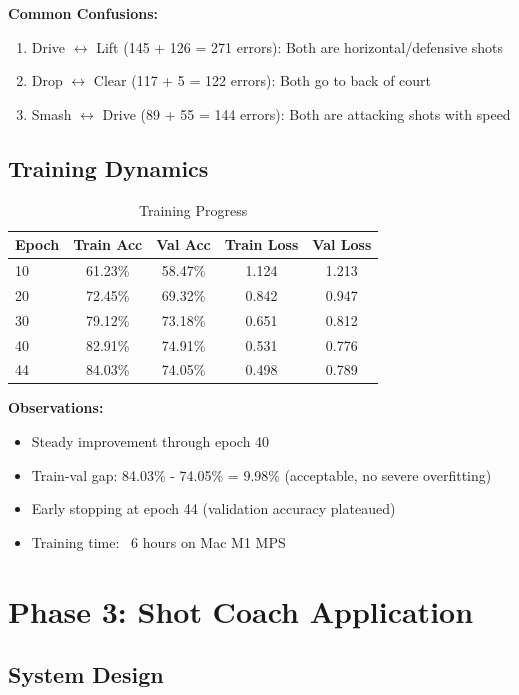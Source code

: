 \documentclass[12pt,a4paper]{article}
\begin{document}
\textbf{Common Confusions:}
\begin{enumerate}
\item Drive $\leftrightarrow$ Lift (145 + 126 = 271 errors): Both are horizontal/defensive shots
\item Drop $\leftrightarrow$ Clear (117 + 5 = 122 errors): Both go to back of court
\item Smash $\leftrightarrow$ Drive (89 + 55 = 144 errors): Both are attacking shots with speed
\end{enumerate}

\subsection{Training Dynamics}

\begin{table}[H]
\centering
\caption{Training Progress}
\begin{tabular}{lcccc}
\toprule
Epoch & Train Acc & Val Acc & Train Loss & Val Loss \\
\midrule
10 & 61.23\% & 58.47\% & 1.124 & 1.213 \\
20 & 72.45\% & 69.32\% & 0.842 & 0.947 \\
30 & 79.12\% & 73.18\% & 0.651 & 0.812 \\
40 & 82.91\% & 74.91\% & 0.531 & 0.776 \\
44 & 84.03\% & 74.05\% & 0.498 & 0.789 \\
\bottomrule
\end{tabular}
\end{table}

\textbf{Observations:}
\begin{itemize}
\item Steady improvement through epoch 40
\item Train-val gap: 84.03\% - 74.05\% = 9.98\% (acceptable, no severe overfitting)
\item Early stopping at epoch 44 (validation accuracy plateaued)
\item Training time: ~6 hours on Mac M1 MPS
\end{itemize}

\section{Phase 3: Shot Coach Application}

\subsection{System Design}
\end{document}
